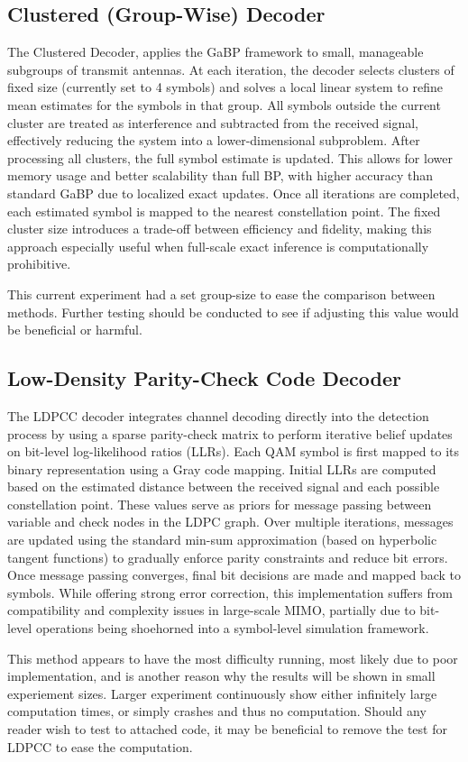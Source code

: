 \documentclass[conference]{IEEEtran}
\begin{document}
\subsection{Clustered (Group-Wise) Decoder}
The Clustered Decoder, applies the GaBP framework to small, manageable subgroups of transmit antennas. At each iteration, the decoder selects clusters of fixed size (currently set to 4 symbols) and solves a local linear system to refine mean estimates for the symbols in that group. All symbols outside the current cluster are treated as interference and subtracted from the received signal, effectively reducing the system into a lower-dimensional subproblem. After processing all clusters, the full symbol estimate is updated. This allows for lower memory usage and better scalability than full BP, with higher accuracy than standard GaBP due to localized exact updates. Once all iterations are completed, each estimated symbol is mapped to the nearest constellation point. The fixed cluster size introduces a trade-off between efficiency and fidelity, making this approach especially useful when full-scale exact inference is computationally prohibitive.\par
This current experiment had a set group-size to ease the comparison between methods. Further testing should be conducted to see if adjusting this value would be beneficial or harmful.

\subsection{Low-Density Parity-Check Code Decoder}
The LDPCC decoder integrates channel decoding directly into the detection process by using a sparse parity-check matrix to perform iterative belief updates on bit-level log-likelihood ratios (LLRs). Each QAM symbol is first mapped to its binary representation using a Gray code mapping. Initial LLRs are computed based on the estimated distance between the received signal and each possible constellation point. These values serve as priors for message passing between variable and check nodes in the LDPC graph. Over multiple iterations, messages are updated using the standard min-sum approximation (based on hyperbolic tangent functions) to gradually enforce parity constraints and reduce bit errors. Once message passing converges, final bit decisions are made and mapped back to symbols. While offering strong error correction, this implementation suffers from compatibility and complexity issues in large-scale MIMO, partially due to bit-level operations being shoehorned into a symbol-level simulation framework.\par
This method appears to have the most difficulty running, most likely due to poor implementation, and is another reason why the results will be shown in small experiement sizes. Larger experiment continuously show either infinitely large computation times, or simply crashes and thus no computation. Should any reader wish to test to attached code, it may be beneficial to remove the test for LDPCC to ease the computation.
\end{document}
